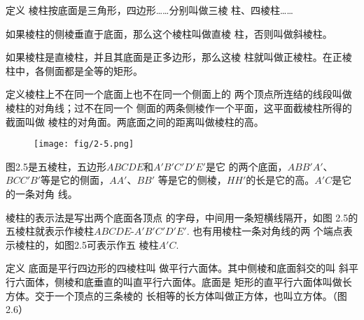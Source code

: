 \begin{blk}{定义}
    棱柱按底面是三角形，四边形……分别叫做三棱
柱、四棱柱……

如果棱柱的侧棱垂直于底面，那么这个棱柱叫做直棱
柱，否则叫做斜棱柱。

如果棱柱是直棱柱，并且其底面是正多边形，那么这棱
柱就叫做正棱柱。在正棱柱中，各侧面都是全等的矩形。
\end{blk}
 
\begin{blk}
    {定义}棱柱上不在同一个底面上也不在同一个侧面上的
两个顶点所连结的线段叫做棱柱的对角线；过不在同一个
侧面的两条侧棱作一个平面，这平面截棱柱所得的截面叫做
棱柱的对角面。两底面之间的距离叫做棱柱的高。
\end{blk}

\begin{figure}[htp]
    \centering
\texttt{[image: fig/2-5.png]}
    \caption{}
\end{figure}

图2.5是五棱柱，五边形$ABCDE$和$A'B'C'D'E'$是它
的两个底面，$ABB'A'$、$BCC'B'$等是它的侧面，$AA'$、$BB'$
等是它的侧棱，$HH'$的长是它的高。$A'C$是它的一条对角
线。

棱柱的表示法是写出两个底面各顶点
的字母，中间用一条短横线隔开，如图
2.5的五棱柱就表示作棱柱$ABCDE$-$A'
B'C'D'E'$. 也有用棱柱一条对角线的两
个端点表示棱柱的，如图2.5可表示作五
棱柱$A'C$. 

\begin{blk}{定义} 
    底面是平行四边形的四棱柱叫
    做平行六面体。其中侧棱和底面斜交的叫
    斜平行六面体，侧棱和底垂直的叫直平行六面体。底面是
    矩形的直平行六面体叫做长方体。交于一个顶点的三条棱的
    长相等的长方体叫做正方体，也叫立方体。（图2.6）
\end{blk}

